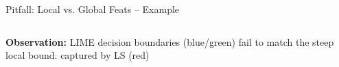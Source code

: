 \documentclass[10pt,compress,t,notes=noshow, xcolor=table]{beamer}
\begin{document}
\begin{frame}{Pitfall: Local vs. Global Feats -- Example}
\begin{columns}[T, totalwidth=\textwidth]
\begin{column}{0.37\textwidth}
\textbf{Observation:} LIME decision boundaries (blue/green) fail to match the steep local bound. captured by LS (red)

  \end{column}
\end{columns}
        
\end{frame}
\end{document}

